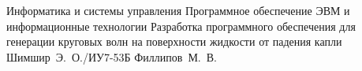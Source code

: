 \documentclass{bmstu}
\begin{document}
\renewcommand{\thelstlisting}{\arabic{lstlisting}}

\makecourseworktitle
    {Информатика и системы управления}
    {Программное обеспечение ЭВМ и информационные технологии}
    {Разработка программного обеспечения для генерации круговых волн на поверхности жидкости от
    падения капли}
    {Шимшир~Э.~О./ИУ7-53Б}
    {Филлипов~М.~В.}
    {}

\maketableofcontents






\makebibliography
\end{document}
